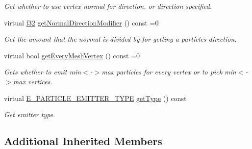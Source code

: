 \begin{DoxyCompactItemize}
\begin{DoxyCompactList}\small\item\em Get whether to use vertex normal for direction, or direction specified. \end{DoxyCompactList}\item 
\mbox{\label{classirr_1_1scene_1_1IParticleAnimatedMeshSceneNodeEmitter_a473f626357779e7aaf4080aa41414b4a}} 
virtual \hyperlink{namespaceirr_a0277be98d67dc26ff93b1a6a1d086b07}{f32} \hyperlink{classirr_1_1scene_1_1IParticleAnimatedMeshSceneNodeEmitter_a473f626357779e7aaf4080aa41414b4a}{get\+Normal\+Direction\+Modifier} () const =0
\begin{DoxyCompactList}\small\item\em Get the amount that the normal is divided by for getting a particles direction. \end{DoxyCompactList}\item 
\mbox{\label{classirr_1_1scene_1_1IParticleAnimatedMeshSceneNodeEmitter_afe672788259a71157ab26ff334d68c52}} 
virtual bool \hyperlink{classirr_1_1scene_1_1IParticleAnimatedMeshSceneNodeEmitter_afe672788259a71157ab26ff334d68c52}{get\+Every\+Mesh\+Vertex} () const =0
\begin{DoxyCompactList}\small\item\em Gets whether to emit min$<$-\/$>$max particles for every vertex or to pick min$<$-\/$>$max vertices. \end{DoxyCompactList}\item 
\mbox{\label{classirr_1_1scene_1_1IParticleAnimatedMeshSceneNodeEmitter_a1fb468ed4d8976e084d56d11024d310d}} 
virtual \hyperlink{namespaceirr_1_1scene_a3e251a881c886884a78adea2e546272b}{E\+\_\+\+P\+A\+R\+T\+I\+C\+L\+E\+\_\+\+E\+M\+I\+T\+T\+E\+R\+\_\+\+T\+Y\+PE} \hyperlink{classirr_1_1scene_1_1IParticleAnimatedMeshSceneNodeEmitter_a1fb468ed4d8976e084d56d11024d310d}{get\+Type} () const
\begin{DoxyCompactList}\small\item\em Get emitter type. \end{DoxyCompactList}\end{DoxyCompactItemize}
\subsection*{Additional Inherited Members}


